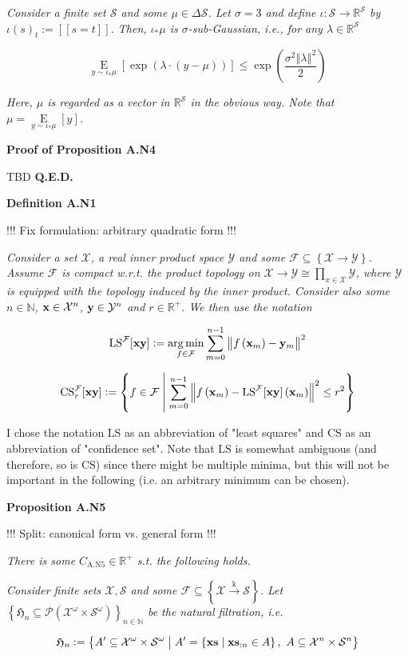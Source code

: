 \documentclass[a4paper]{article}
\newcommand{\Co}[1]{}
\newcommand{\AP}[1]{\left(#1\right)}
\newcommand{\AB}[1]{\left[#1\right]}
\newcommand{\AC}[1]{\left\{#1\right\}}
\newcommand{\ACM}[2]{\left\{#1\;\middle\vert\;#2\right\}}
\newcommand{\Ea}[2]{\underset{#1}{\operatorname{E}}\AB{#2}}
\newcommand{\PS}[1]{\mathcal{P}\AP{#1}}
\newcommand{\Argmin}[1]{\underset{#1}{\operatorname{arg\,min}}\,}
\newcommand{\Nats}{\mathbb{N}}
\newcommand{\Reals}{\mathbb{R}}
\newcommand{\Norm}[1]{\left\Vert #1 \right\Vert}
\newcommand{\K}{\xrightarrow{\mathrm{k}}}
\newcommand{\X}{\mathcal{X}}
\newcommand{\Y}{\mathcal{Y}}
\newcommand{\F}{\mathcal{F}}
\newcommand{\St}{\mathcal{S}}
\newcommand{\LS}{\mathrm{LS}}
\newcommand{\CS}{\mathrm{CS}}
\begin{document}
\textit{Consider a finite set $\St$ and some $\mu\in\Delta\St$. Let $\sigma=3$ and define $\iota:\St\rightarrow\Reals^\St$ by $\iota(s)_t:=[[s=t]]$. Then, $\iota_*\mu$ is $\sigma$-sub-Gaussian, i.e., for any $\lambda\in\Reals^\St$}\Co{i}

$$\Ea{y\sim\iota_*\mu}{\exp\AP{\lambda\cdot\AP{y-\mu}}} \leq \exp\AP{\frac{\sigma^2\Norm{\lambda}^2}{2}}$$

\textit{Here, $\mu$ is regarded as a vector in $\Reals^\St$ in the obvious way. Note that $\mu=\Ea{y\sim\iota_*\mu}{y}$.}\Co{i}

\textbf{Proof of Proposition A.N4}\Co{b}

TBD \textbf{Q.E.D.}\Co{b}

\textbf{Definition A.N1}\Co{b}

!!! Fix formulation: arbitrary quadratic form !!!

\textit{Consider a set $\X$, a real inner product space $\Y$ and some $\F\subseteq\AC{\X\rightarrow\Y}$. Assume $\F$ is compact w.r.t. the product topology on $\X\rightarrow\Y\cong\prod_{x\in\X}\Y$, where $\Y$ is equipped with the topology induced by the inner product. Consider also some $n\in\Nats$, $\bold{x}\in\X^n$, $\bold{y}\in\Y^n$ and $r\in\Reals^+$. We then use the notation}\Co{i}

$$\LS^\F[\bold{xy}]:=\Argmin{f\in\F}{\sum_{m=0}^{n-1}\Norm{f\AP{\bold{x}_m}-\bold{y}_m}^2}$$

$$\CS^\F_{r}[\bold{xy}]:=\ACM{f\in\F}{\sum_{m=0}^{n-1}\Norm{f\AP{\bold{x}_m}-\LS^\F[\bold{xy}]\AP{\bold{x}_m}}^2\leq r^2}$$

I chose the notation $\LS$ as an abbreviation of "least squares" and $\CS$ as an abbreviation of "confidence set". Note that $\LS$ is somewhat ambiguous (and therefore, so is $\CS$) since there might be multiple minima, but this will not be important in the following (i.e. an arbitrary minimum can be chosen).

\textbf{Proposition A.N5}\Co{b}

!!! Split: canonical form vs. general form !!!

\textit{There is some $C_{\mathrm{A.N5}}\in\Reals^+$ s.t. the following holds.}\Co{i}

\textit{Consider finite sets $\X,\St$ and some $\F\subseteq\AC{\X\K\St}$. Let $\AC{\mathfrak{H}_n\subseteq\PS{\X^\omega\times\St^\omega}}_{n\in\Nats}$ be the natural filtration, i.e.}\Co{i}

$$\mathfrak{H}_n:=\ACM{A'\subseteq\X^\omega\times\St^\omega}{A'=\ACM{\bold{xs}}{\bold{xs}_{:n}\in A},\ A\subseteq\X^n\times\St^n}$$
\end{document}
